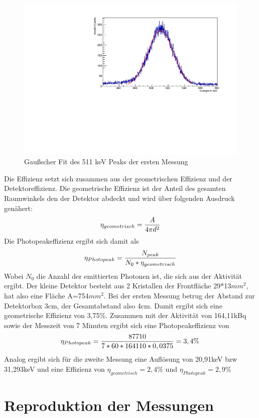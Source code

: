 \documentclass[a4paper,11pt,twoside]{article}
\begin{document}
%
\begin{figure}[H]
	\begin{center}
		\includegraphics[width=0.7\linewidth]{Fit1.pdf}
		\caption{Gaußscher Fit des 511 keV Peaks der ersten Messung}
		\label{l2}
	\end{center}
\end{figure}
%


Die Effizienz setzt sich zusammen aus der geometrischen Effizienz und der Detektoreffizienz. Die geometrische Effizienz ist der Anteil des gesamten Raumwinkels den der Detektor abdeckt und wird über folgenden Ausdruck genähert:
\begin{equation}
\eta_{geometrisch}={A\over 4 \pi d^2}
\end{equation}
Die Photopeakeffizienz ergibt sich damit als
\begin{equation}
\eta_{Photopeak}={N_{peak}\over N_0*\eta_{geometrisch}}
\end{equation}
Wobei $N_0$ die Anzahl der emittierten Photonen ist, die sich aus der Aktivität ergibt. Der kleine Detektor besteht aus 2 Kristallen der Frontfläche 29*13$mm^2$, hat also eine Fläche A=754$mm^2$. Bei der ersten Messung betrug der Abstand zur Detektorbox 3cm, der Gesamtabstand also 4cm. Damit ergibt sich eine geometrische Effizienz von 3,75\%. Zusammen mit der Aktivität von 164,11kBq sowie der Messzeit von 7 Minuten ergibt sich eine Photopeakeffizienz von
\begin{equation}
\eta_{Photopeak}={87710\over 7*60*164110*0,0375}=3,4\%
\end{equation}
Analog ergibt sich für die zweite Messung eine Auflösung von 20,91keV bzw 31,293keV und eine Effizienz von $\eta_{geometrisch}=2,4\%$ und $\eta_{Photopeak}=2,9\%$


\section{Reproduktion der Messungen}
\end{document}

